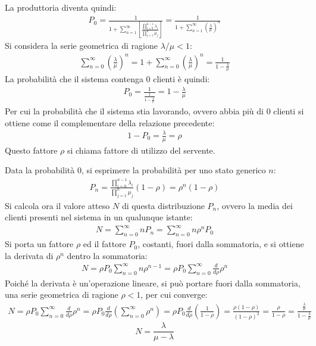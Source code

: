\documentclass{article}
\numberwithin{equation}{subsection}
\begin{document}
La produttoria diventa quindi:
\begin{gather*}
    P_0=\displaystyle\frac{1}{1+\displaystyle\sum_{n=1}^{\infty}\left[\frac{\displaystyle\prod_{i=0}^{n-1}\lambda_i}{\displaystyle\prod_{j=1}^n\mu_j}\right]}=\frac{1}{1+\displaystyle\sum_{n=1}^{\infty}\left(\frac{\lambda}{\mu}\right)^n}
\end{gather*}
Si considera la serie geometrica di ragione $\lambda/\mu<1$:
\begin{gather*}
    \displaystyle\sum_{n=0}^{\infty}\left(\frac{\lambda}{\mu}\right)^n=1+\sum_{n=0}^{\infty}\left(\frac{\lambda}{\mu}\right)^n=\frac{1}{1-\displaystyle\frac{\lambda}{\mu}}
\end{gather*}
La probabilità che il sistema contenga $0$ clienti è quindi:
\begin{gather*}
    P_0=\displaystyle\frac{1}{\displaystyle\frac{1}{1-\displaystyle\frac{\lambda}{\mu}}}=1-\frac{\lambda}{\mu}
\end{gather*}
Per cui la probabilità che il sistema stia lavorando, ovvero abbia più di $0$ clienti si ottiene come il complementare della relazione precedente:
\begin{gather*}
    1-P_0=\displaystyle\frac{\lambda}{\mu}=\rho
\end{gather*}
Questo fattore $\rho$ si chiama fattore di utilizzo del servente. 

Data la probabilità $0$, si esprimere la probabilità per uno stato generico $n$:
\begin{gather*}
    P_n=\displaystyle\frac{\displaystyle\prod_{i=0}^{n-1}\lambda_i}{\displaystyle\prod_{j=1}^n\mu_j}\left(1-\rho\right)=\rho^n\left(1-\rho\right)
\end{gather*}
Si calcola ora il valore atteso $N$ di questa distribuzione $P_n$, ovvero la media dei clienti presenti nel sistema in un qualunque istante:
\begin{gather*}
    N=\displaystyle\sum_{n=0}^{\infty}nP_n=\sum_{n=0}^{\infty}n\rho^nP_0
\end{gather*}
Si porta un fattore $\rho$ ed il fattore $P_0$, costanti, fuori dalla sommatoria, e si ottiene la derivata di $\rho^n$ dentro la sommatoria:
\begin{gather*}
    N=\rho P_0\displaystyle\sum_{n=0}^{\infty}n\rho^{n-1}=\rho P_0\displaystyle\sum_{n=0}^{\infty}\frac{d}{d\rho}\rho^n
\end{gather*}
Poiché la derivata è un'operazione lineare, si può portare fuori dalla sommatoria, una serie geometrica di ragione $\rho<1$, per cui converge:
\begin{gather*}
    N=\rho P_0\displaystyle\sum_{n=0}^{\infty}\frac{d}{d\rho}\rho^n=\rho P_0\frac{d}{d\rho}\left(\sum_{n=0}^{\infty}\rho^n\right)=\rho P_0\frac{d}{d\rho}\left(\frac{1}{1-\rho}\right)=\frac{\rho(1-\rho)}{(1-\rho)^2}=\frac{\rho}{1-\rho}=\frac{\displaystyle\frac{\lambda}{\mu}}{1-\displaystyle\frac{\lambda}{\mu}}
\end{gather*}
\begin{equation}
    N=\displaystyle\frac{\lambda}{\mu-\lambda}
\end{equation}
\end{document}
